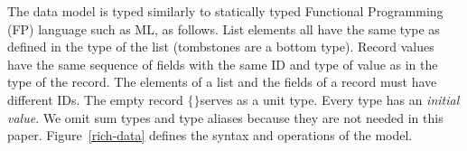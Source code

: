 \documentclass[english,submission]{programming}
\theoremstyle{definition}
\newtheorem*{remark}{Remark}
\newcommand{\mathbox}[1]{\colorbox{black!10}{$#1$\phantom{i\hspace{-3.5pt}}}}
\begin{document}

The data model is typed similarly to statically typed Functional Programming (FP) language such as ML, as follows. List elements all have the same type as defined in the type of the list (tombstones are a bottom type). Record values have the same sequence of fields with the same ID and type of value as in the type of the record. The elements of a list and the fields of a record must have different IDs.
The empty record \mathbox{\text{\{\}}}serves as a unit type. Every type has an \textit{initial value}.
We omit sum types and type aliases because they are not needed in this paper.
Figure~\ref{rich-data} defines the syntax and operations of the model.
\end{document}
